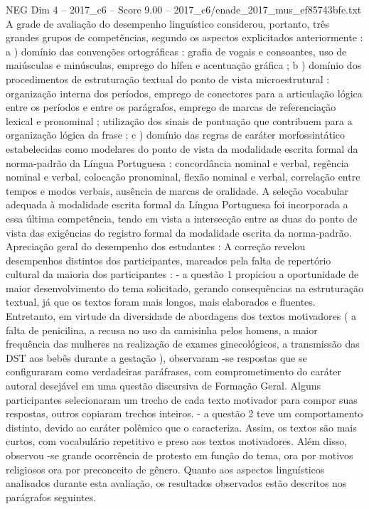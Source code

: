 \begin{textsample}{NEG Dim 4 – 2017\_c6 – Score 9.00 – 2017\_c6/enade\_2017\_mus\_ef85743bfe.txt}
A grade de avaliação do desempenho linguístico considerou, portanto, três grandes grupos de competências, segundo os aspectos explicitados anteriormente : a ) domínio das convenções ortográficas : grafia de vogais e consoantes, uso de maiúsculas e minúsculas, emprego do hífen e acentuação gráfica ; b ) domínio dos procedimentos de estruturação textual do ponto de vista microestrutural : organização interna dos períodos, emprego de conectores para a articulação lógica entre os períodos e entre os parágrafos, emprego de marcas de referenciação lexical e pronominal ; utilização dos sinais de pontuação que contribuem para a organização lógica da frase ; c ) domínio das regras de caráter morfossintático estabelecidas como modelares do ponto de vista da modalidade escrita formal da norma-padrão da Língua Portuguesa : concordância nominal e verbal, regência nominal e verbal, colocação pronominal, flexão nominal e verbal, correlação entre tempos e modos verbais, ausência de marcas de oralidade.
A seleção vocabular adequada à modalidade escrita formal da Língua Portuguesa foi incorporada a essa última competência, tendo em vista a intersecção entre as duas do ponto de vista das exigências do registro formal da modalidade escrita da norma-padrão.
Apreciação geral do desempenho dos estudantes : A correção revelou desempenhos distintos dos participantes, marcados pela falta de repertório cultural da maioria dos participantes : - a questão 1 propiciou a oportunidade de maior desenvolvimento do tema solicitado, gerando consequências na estruturação textual, já que os textos foram mais longos, mais elaborados e fluentes.
Entretanto, em virtude da diversidade de abordagens dos textos motivadores ( a falta de penicilina, a recusa no uso da camisinha pelos homens, a maior frequência das mulheres na realização de exames ginecológicos, a transmissão das DST aos bebês durante a gestação ), observaram -se respostas que se configuraram como verdadeiras paráfrases, com comprometimento do caráter autoral desejável em uma questão discursiva de Formação Geral.
Alguns participantes selecionaram um trecho de cada texto motivador para compor suas respostas, outros copiaram trechos inteiros. - a questão 2 teve um comportamento distinto, devido ao caráter polêmico que o caracteriza.
Assim, os textos são mais curtos, com vocabulário repetitivo e preso aos textos motivadores.
Além disso, observou -se grande ocorrência de protesto em função do tema, ora por motivos religiosos ora por preconceito de gênero.
Quanto aos aspectos linguísticos analisados durante esta avaliação, os resultados observados estão descritos nos parágrafos seguintes.

\end{textsample}
